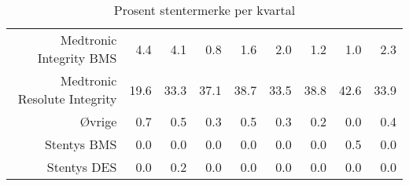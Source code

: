 \documentclass[presentation,xcolor=pdftex,dvipsnames,table]{beamer}
\begin{document}
\begin{frame}
\begin{tiny}
\begin{table}[ht]
\begin{tabular}{rrrrrrrrr}
  Medtronic Integrity BMS & 4.4 & 4.1 & 0.8 & 1.6 & 2.0 & 1.2 & 1.0 & 2.3 \\ 
  Medtronic Resolute Integrity & 19.6 & 33.3 & 37.1 & 38.7 & 33.5 & 38.8 & 42.6 & 33.9 \\ 
  Øvrige & 0.7 & 0.5 & 0.3 & 0.5 & 0.3 & 0.2 & 0.0 & 0.4 \\ 
  Stentys BMS & 0.0 & 0.0 & 0.0 & 0.0 & 0.0 & 0.0 & 0.5 & 0.0 \\ 
  Stentys DES & 0.0 & 0.2 & 0.0 & 0.0 & 0.0 & 0.0 & 0.0 & 0.0 \\ 
   \bottomrule
\end{tabular}
\caption{Prosent stentermerke per kvartal} 
\end{table}\end{tiny}
\end{frame}
\end{document}
